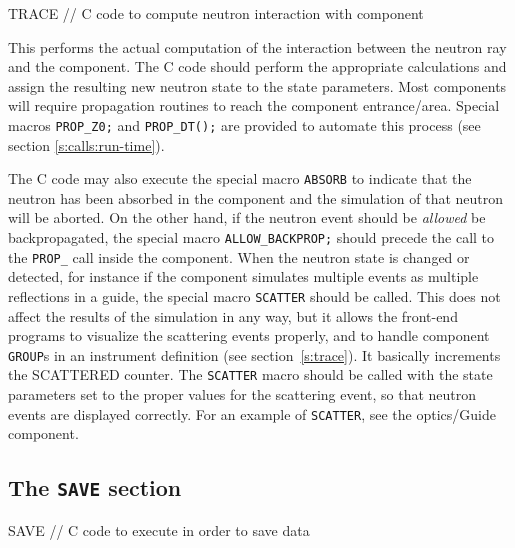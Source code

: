 \begin{mcstas}
TRACE
// C code to compute neutron interaction with component
\end{mcstas}
This performs the actual computation of the interaction between the
neutron ray and the component. The C code should perform the appropriate
calculations and assign the resulting new neutron state to the state
parameters. Most components will require propagation routines to reach the component entrance/area. Special macros \verb+PROP_Z0;+ and \verb+PROP_DT();+ are provided to automate this process (see section \ref{s:calls:run-time}).

The C code may also execute the special macro \texttt{ABSORB} to indicate
that the neutron has been absorbed in the component and the simulation of
that neutron will be aborted.
On the other hand, if the neutron event
should be \emph{allowed} be backpropagated, the special macro
\verb+ALLOW_BACKPROP;+ should precede the call to the \verb+PROP_+
call inside the component.
When the neutron state is changed or detected, for
instance if the component simulates multiple events as multiple
reflections in a guide, the
special macro \texttt{SCATTER}
should be called. This does not affect the
results of the simulation in any way, but it allows the front-end
programs to visualize the scattering events properly, and to handle
component \texttt{GROUP}s in an instrument definition (see
section~\ref{s:trace}). It basically increments the SCATTERED counter.
The \texttt{SCATTER} macro should be called with
the state parameters set to the proper values for the scattering event, so that neutron events are displayed correctly.
For an example of \texttt{SCATTER}, see the optics/Guide
component.


\subsection{The \texttt{SAVE} section}
\label{s:comp-save}

\begin{mcstas}
SAVE
// C code to execute in order to save data 
\end{mcstas}

